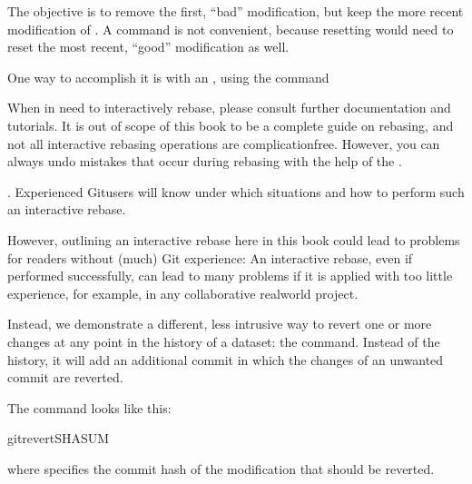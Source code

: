 \sphinxAtStartPar
The objective is to remove the first, “bad” modification, but
keep the more recent modification of . A 
command is not convenient, because resetting would need to reset
the most recent, “good” modification as well.

\sphinxAtStartPar
One way to accomplish it is with an , using the
 command%
\begin{footnote}\sphinxAtStartFootnote
When in need to interactively rebase, please consult further documentation
and tutorials. It is out of scope of this book to be a complete
guide on rebasing, and not all interactive rebasing operations are
complication\sphinxhyphen{}free. However, you can always undo mistakes that occur
during rebasing with the help of the .
%
\end{footnote}. Experienced Git\sphinxhyphen{}users will know
under which situations and how to perform such an interactive rebase.

\sphinxAtStartPar
However, outlining an interactive rebase here in this book could lead to
problems for readers without (much) Git experience: An interactive rebase,
even if performed successfully, can lead to many problems if it is applied with
too little experience, for example, in any collaborative real\sphinxhyphen{}world project.

\ignorespaces 
\sphinxAtStartPar
Instead, we demonstrate a different, less intrusive way to revert one or more
changes at any point in the history of a dataset: the 
command.
Instead of  the history, it will add an additional commit in which
the changes of an unwanted commit are reverted.

\sphinxAtStartPar
The command looks like this:

\begin{sphinxVerbatim}[commandchars=\\\{\}]
gitrevertSHASUM
\end{sphinxVerbatim}

\sphinxAtStartPar
where  specifies the commit hash of the modification that should
be reverted.

